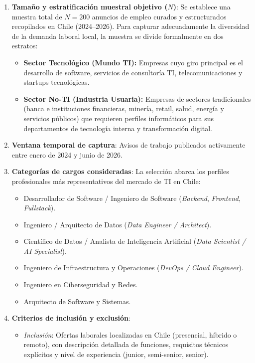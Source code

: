 \begin{enumerate}[label=\alph*.]
    \item \textbf{Tamaño y estratificación muestral objetivo ($N$)}: Se establece una muestra total de $N = 200$ anuncios de empleo curados y estructurados recopilados en Chile (2024–2026). Para capturar adecuadamente la diversidad de la demanda laboral local, la muestra se divide formalmente en dos estratos:
    \begin{itemize}
        \item \textbf{Sector Tecnológico (Mundo TI):} Empresas cuyo giro principal es el desarrollo de software, servicios de consultoría TI, telecomunicaciones y startups tecnológicas.
        \item \textbf{Sector No-TI (Industria Usuaria):} Empresas de sectores tradicionales (banca e instituciones financieras, minería, retail, salud, energía y servicios públicos) que requieren perfiles informáticos para sus departamentos de tecnología interna y transformación digital.
    \end{itemize}
    \item \textbf{Ventana temporal de captura}: Avisos de trabajo publicados activamente entre enero de 2024 y junio de 2026.
    \item \textbf{Categorías de cargos consideradas}: La selección abarca los perfiles profesionales más representativos del mercado de TI en Chile:
    \begin{itemize}
        \item Desarrollador de Software / Ingeniero de Software (\textit{Backend}, \textit{Frontend}, \textit{Fullstack}).
        \item Ingeniero / Arquitecto de Datos (\textit{Data Engineer / Architect}).
        \item Científico de Datos / Analista de Inteligencia Artificial (\textit{Data Scientist / AI Specialist}).
        \item Ingeniero de Infraestructura y Operaciones (\textit{DevOps / Cloud Engineer}).
        \item Ingeniero en Ciberseguridad y Redes.
        \item Arquitecto de Software y Sistemas.
    \end{itemize}
    \item \textbf{Criterios de inclusión y exclusión}:
    \begin{itemize}
        \item \textit{Inclusión}: Ofertas laborales localizadas en Chile (presencial, híbrido o remoto), con descripción detallada de funciones, requisitos técnicos explícitos y nivel de experiencia (junior, semi-senior, senior).

\end{itemize}
\end{enumerate}
